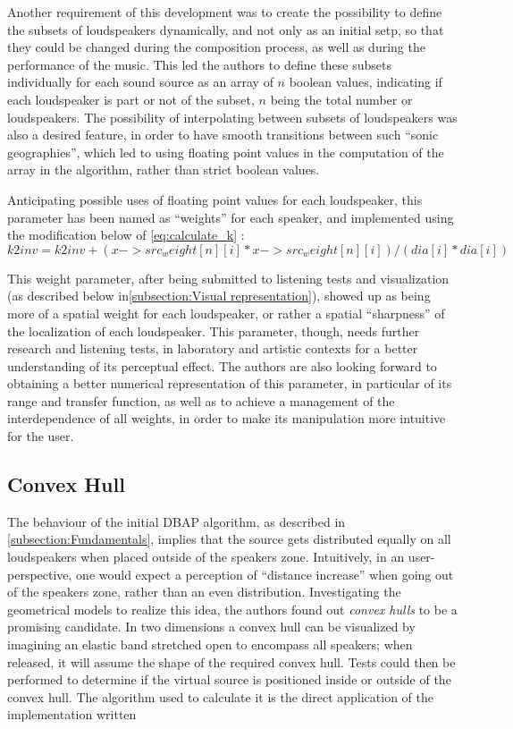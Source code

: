 \documentclass[twoside,10pt]{article}
\begin{document}
Another requirement of this development was to create the possibility to define the subsets of loudspeakers dynamically, and not only as an initial setp, so that they could be changed during the composition process, as well as during the performance of the music. This led the authors to define these subsets individually for each sound source as an array of $n$ boolean values, indicating if each loudspeaker is part or not of the subset, $n$ being the total number or loudspeakers.
The possibility of interpolating between subsets of loudspeakers was also a desired feature, in order to have smooth transitions between such ``sonic geographies'', which led to using floating point values in the computation of the array in the algorithm, rather than strict boolean values. 

Anticipating possible uses of floating point values for each loudspeaker, this parameter has been named as ``weights'' for each speaker, and implemented using the modification below of \ref{eq:calculate_k} :
\begin{equation} \label{eq:2Dweight}
k2inv = k2inv + (x->src_weight[n][i]*x->src_weight[n][i])/(dia[i]*dia[i])
\end{equation}

This weight parameter, after being submitted to listening tests and visualization (as described below in\ref{subsection:Visual representation}), showed up as being more of a spatial weight for each loudspeaker, or rather a spatial ``sharpness'' of the localization of each loudspeaker. This parameter, though, needs further research and listening tests, in laboratory and artistic contexts for a better understanding of its perceptual effect.
The authors are also looking forward to obtaining a better numerical representation of this parameter, in particular of its range and transfer function, as well as to achieve a management of the interdependence of all weights, in order to make its manipulation more intuitive for the user.

\subsection{Convex Hull}

The behaviour of the initial DBAP algorithm, as described in \ref{subsection:Fundamentals}, implies that the source gets distributed equally on all loudspeakers when placed outside of the speakers zone. Intuitively, in an user-perspective, one would expect a perception of ``distance increase'' when going out of the speakers zone, rather than an even distribution.
Investigating the geometrical models to realize this idea, the authors found out \textit{convex hulls} to be a promising candidate.
In two dimensions a convex hull can be visualized by imagining an elastic band stretched open to encompass all speakers; when released, it will assume the shape of the required convex hull. Tests could then be performed to determine if the virtual source is positioned inside or outside of the convex hull. 
The algorithm used to calculate it is the direct application of the implementation written \cite{Rourke:1998_geometry}
\end{document}
